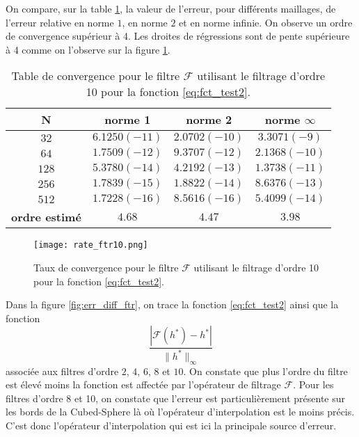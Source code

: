 On compare, sur la table \ref{tab:rate_ftr10}, la valeur de l'erreur, pour différents maillages, de l'erreur relative en norme $1$, en norme $2$ et en norme infinie. On observe un ordre de convergence supérieur à 4. Les droites de régressions sont de pente supérieure à 4 comme on l'observe sur la figure \ref{fig:rate_ftr10}.

\begin{table}[htbp]
\begin{center}
\begin{tabular}{|c||c|c|c|}
\hline
\textbf{N}  & \textbf{norme 1} & \textbf{norme 2} & \textbf{norme $\infty$} \\
\hline
\hline
$32$ & $6.1250(-11)$  & $2.0702(-10)$  & $3.3071(-9)$  \\
$64$ & $1.7509(-12)$  & $9.3707(-12)$  & $2.1368(-10)$  \\
$128$& $5.3780(-14)$  & $4.2192(-13)$  & $1.3738(-11)$  \\
$256$& $1.7839(-15)$  & $1.8822(-14)$  & $8.6376(-13)$  \\
$512$& $1.7228(-16)$  & $8.5616(-16)$  & $5.4099(-14)$  \\
\hline
\hline
\textbf{ordre estimé}& $4.68$ & $4.47$ & $3.98$\\
\hline
\end{tabular}
\end{center}
\caption{Table de convergence pour le filtre $\mathcal{F}$ utilisant le filtrage d'ordre 10 pour la fonction \eqref{eq:fct_test2}.}
\label{tab:rate_ftr10}
\end{table} 

\begin{figure}[htbp]
\begin{center}
\texttt{[image: rate\_ftr10.png]}
\end{center}
\caption{Taux de convergence pour le filtre $\mathcal{F}$ utilisant le filtrage d'ordre 10 pour la fonction \eqref{eq:fct_test2}.}
\label{fig:rate_ftr10}
\end{figure}

Dans la figure \ref{fig:err_diff_ftr}, on trace la fonction \eqref{eq:fct_test2} ainsi que la fonction
\begin{equation}
\dfrac{|\mathcal{F}(h^*) - h^*|}{\| h^* \|_{\infty}}
\label{eq:ftr_err}
\end{equation}
associée aux filtres d'ordre $2$, $4$, $6$, $8$ et $10$. On constate que plus l'ordre du filtre est élevé moins la fonction est affectée par l'opérateur de filtrage $\mathcal{F}$. Pour les filtres d'ordre 8 et 10, on constate que l'erreur est particulièrement présente sur les bords de la Cubed-Sphere là où l'opérateur d'interpolation est le moins précis. C'est donc l'opérateur d'interpolation qui est ici la principale source d'erreur.

